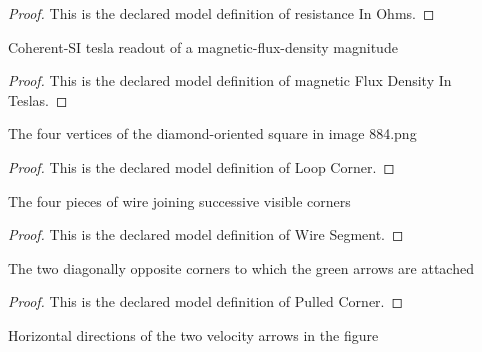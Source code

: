 \begin{proof}
  This is the declared model definition of resistance In Ohms.
\end{proof}
\begin{definition}
  \label{def:physics:phyx-mini-0884:phyxminiproblems-problemphyxmini0884-magneticfluxdensityinteslas}
  Coherent-SI tesla readout of a magnetic-flux-density magnitude
\end{definition}
\begin{proof}
  This is the declared model definition of magnetic Flux Density In Teslas.
\end{proof}
\begin{definition}
  \label{def:physics:phyx-mini-0884:phyxminiproblems-problemphyxmini0884-loopcorner}
  The four vertices of the diamond-oriented square in image 884.png
\end{definition}
\begin{proof}
  This is the declared model definition of Loop Corner.
\end{proof}
\begin{definition}
  \label{def:physics:phyx-mini-0884:phyxminiproblems-problemphyxmini0884-wiresegment}
  The four pieces of wire joining successive visible corners
\end{definition}
\begin{proof}
  This is the declared model definition of Wire Segment.
\end{proof}
\begin{definition}
  \label{def:physics:phyx-mini-0884:phyxminiproblems-problemphyxmini0884-pulledcorner}
  The two diagonally opposite corners to which the green arrows are attached
\end{definition}
\begin{proof}
  This is the declared model definition of Pulled Corner.
\end{proof}
\begin{definition}
  \label{def:physics:phyx-mini-0884:phyxminiproblems-problemphyxmini0884-horizontaldirection}
  Horizontal directions of the two velocity arrows in the figure
\end{definition}
